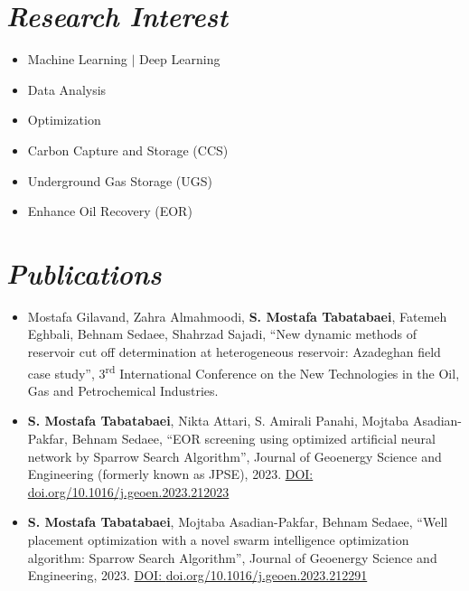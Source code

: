 \documentclass[a4paper, 11pt, sans]{article}
\newcommand{\resumeSubHeadingListStart}{\begin{itemize}[leftmargin=0.0in, label={}]}
\newcommand{\resumeSubHeadingListEnd}{\end{itemize}}
\newcommand{\publicationtemp}[1]{
	\begin{itemize}
		\item \small \justifying #1
	\end{itemize}
}
\newcommand{\paper}[3]{
	#1, “#2”, #3
}
\newcommand{\bluesection}[1]{
	\textcolor{navyblue}{\textit{#1}}
}
\begin{document}
\section{\bluesection{Research Interest}}
	 \begin{multicols}{3}
		\begin{itemize}[itemsep=-2pt, parsep=3pt]
			\item \small Machine Learning $|$ Deep Learning 
			\item \small Data Analysis
			\item \small Optimization
			\item \small Carbon Capture and Storage (CCS)
			\item \small Underground Gas Storage (UGS)
			\item \small Enhance Oil Recovery (EOR)
			
		\end{itemize}
		 \end{multicols}
	
	
\vspace{2pt}	
\section{\bluesection{Publications}}
\vspace{2pt}
\publicationtemp{\paper{Mostafa Gilavand, Zahra Almahmoodi, \textbf{S. Mostafa Tabatabaei}, Fatemeh Eghbali, Behnam Sedaee, Shahrzad Sajadi}{New dynamic methods of reservoir cut off determination at heterogeneous reservoir: Azadeghan field case study}{3\textsuperscript{rd} International Conference on the New Technologies in the Oil, Gas and Petrochemical Industries.}}{}

\publicationtemp{\paper{\textbf{S. Mostafa Tabatabaei}, Nikta Attari, S. Amirali Panahi, Mojtaba Asadian-Pakfar, Behnam Sedaee}{EOR screening using optimized artificial neural network by Sparrow Search Algorithm}{Journal of Geoenergy Science and Engineering (formerly known as JPSE), 2023. \href{https://doi.org/10.1016/j.geoen.2023.212023}{DOI: \textcolor{navyblue}{doi.org/10.1016/j.geoen.2023.212023}}}}

\publicationtemp{\paper{\textbf{S. Mostafa Tabatabaei}, Mojtaba Asadian-Pakfar, Behnam Sedaee}{Well placement optimization with a novel swarm intelligence optimization algorithm: Sparrow Search Algorithm}{Journal of Geoenergy Science and Engineering, 2023. \href{https://doi.org/10.1016/j.geoen.2023.212291}{DOI: \textcolor{navyblue}{doi.org/10.1016/j.geoen.2023.212291}} }}
\end{document}
